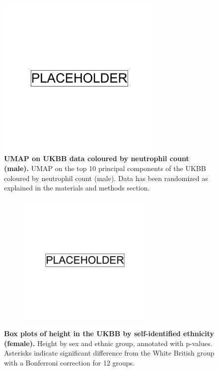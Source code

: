 \newpage

\begin{figure}[ht]
    \centering
    \includegraphics[width=0.7\textwidth]{placeholder.png}
    \caption[UMAP on UKBB data coloured by neutrophil count (male)]{\textbf{UMAP on UKBB data coloured by neutrophil count (male).} UMAP on the top 10 principal components of the UKBB coloured by neutrophil count (male). Data has been randomized as explained in the materials and methods section.}
    \label{fig:supp_ukbb_neutrophill_m}
\end{figure}

\newpage

\begin{figure}[ht]
    \centering
    \begin{subfigure}{\textwidth}
    \includegraphics[width=0.7\textwidth]{placeholder.png}
    \end{subfigure}
    \caption[Box plots of height in the UKBB by self-identified ethnicity (female)]{\textbf{Box plots of height in the UKBB by self-identified ethnicity (female).} Height by sex and ethnic group, annotated with p-values. Asterisks indicate significant difference from the White British group with a Bonferroni correction for 12 groups.}
    \label{fig:supp_box_height_f}
\end{figure}


